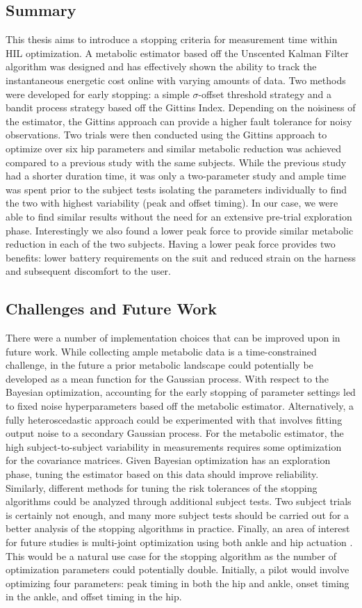 \subsection*{Summary}
This thesis aims to introduce a stopping criteria for measurement time within HIL optimization. A metabolic estimator based off the Unscented Kalman Filter algorithm was designed and has effectively shown the ability to track the instantaneous energetic cost online with varying amounts of data. Two methods were developed for early stopping: a simple $\sigma$-offset threshold strategy and a bandit process strategy based off the Gittins Index. Depending on the noisiness of the estimator, the Gittins approach can provide a higher fault tolerance for noisy observations. Two trials were then conducted using the Gittins approach to optimize over six hip parameters and similar metabolic reduction was achieved compared to a previous study with the same subjects. While the previous study had a shorter duration time, it was only a two-parameter study and ample time was spent prior to the subject tests isolating the parameters individually to find the two with highest variability (peak and offset timing). In our case, we were able to find similar results without the need for an extensive pre-trial exploration phase. Interestingly we also found a lower peak force to provide similar metabolic reduction in each of the two subjects. Having a lower peak force provides two benefits: lower battery requirements on the suit and reduced strain on the harness and subsequent discomfort to the user.

\subsection*{Challenges and Future Work}
There were a number of implementation choices that can be improved upon in future work. While collecting ample metabolic data is a time-constrained challenge, in the future a prior metabolic landscape could potentially be developed as a mean function for the Gaussian process. With respect to the Bayesian optimization, accounting for the early stopping of parameter settings led to fixed noise hyperparameters based off the metabolic estimator. Alternatively, a fully heteroscedastic approach could be experimented with that involves fitting output noise to a secondary Gaussian process. For the metabolic estimator, the high subject-to-subject variability in measurements requires some optimization for the covariance matrices. Given Bayesian optimization has an exploration phase, tuning the estimator based on this data should improve reliability. Similarly, different methods for tuning the risk tolerances of the stopping algorithms could be analyzed through additional subject tests. Two subject trials is certainly not enough, and many more subject tests should be carried out for a better analysis of the stopping algorithms in practice. Finally, an area of interest for future studies is multi-joint optimization using both ankle and hip actuation \citep{1298569}. This would be a natural use case for the stopping algorithm as the number of optimization parameters could potentially double. Initially, a pilot would involve optimizing four parameters: peak timing in both the hip and ankle, onset timing in the ankle, and offset timing in the hip.